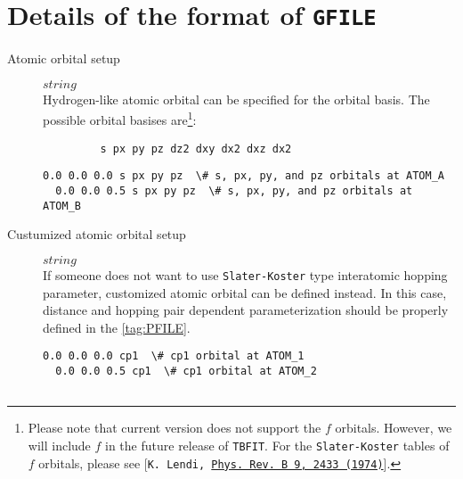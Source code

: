 \documentclass[a4paper,12pt]{scrartcl}
\makeatletter
\def\namedlabel#1#2{\begingroup
    #2%
    \def\@currentlabel{#2}%
    \phantomsection\label{#1}\endgroup
}
\newcommand{\tbfitname}{\textcolor{blue!85!white}{\texttt{TBFIT}}}
\makeatother
\begin{document}
\section{Details of the format of \texttt{GFILE}}\label{tag:GFILE-detail}
\begin{description}

    \item[\namedlabel{tag:ATOMICORB}{Atomic orbital setup}] $string$ \\
        Hydrogen-like atomic orbital can be specified for the orbital basis.
        The possible orbital basises are\footnote{Please note that current 
		version does not support the $f$ orbitals.
        However, we will include $f$ in the future release of \tbfitname{}. 
		For the \texttt{Slater-Koster} tables of $f$ orbitals, please see
		[\texttt{K. Lendi, 
		\href{https://journals.aps.org/prb/abstract/10.1103/PhysRevB.9.2433}
		{Phys. Rev. B 9, 2433 (1974)}}].}:
        \begin{verbatim}
         s px py pz dz2 dxy dx2 dxz dx2
        \end{verbatim}


\begin{Verbatim}[commandchars=\\\{\},gobble=4, frame=single, framesep=2mm, 
    label= setup of atomic orbital basis in \ref{tag:GFILE},
    labelposition=bottomline]
  0.0 0.0 0.0 s px py pz  \# s, px, py, and pz orbitals at ATOM_A
  0.0 0.0 0.5 s px py pz  \# s, px, py, and pz orbitals at ATOM_B

\end{Verbatim}

    \item[\namedlabel{tag:CUSTOM}{Custumized atomic orbital setup}] $string$ \\
        If someone does not want to use \texttt{Slater-Koster} type interatomic
        hopping parameter, customized atomic orbital can be defined instead.
        In this case, distance and hopping pair dependent parameterization
        should be properly defined in the \ref{tag:PFILE}.

\begin{Verbatim}[commandchars=\\\{\},gobble=4, frame=single, framesep=2mm, 
    label= setup of custumized atomic orbital name $cp1$,
    labelposition=bottomline]
  0.0 0.0 0.0 cp1  \# cp1 orbital at ATOM_1
  0.0 0.0 0.5 cp1  \# cp1 orbital at ATOM_2


\end{Verbatim}
\end{description}
\end{document}
